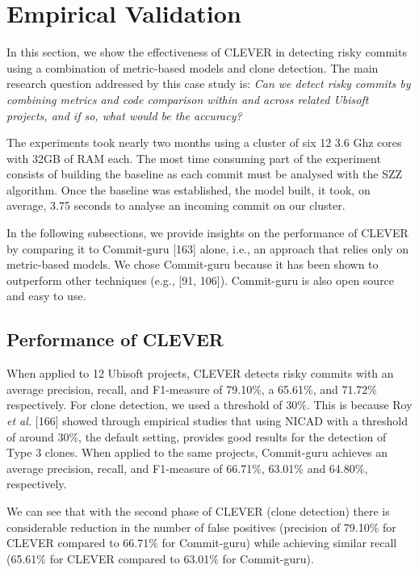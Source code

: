 \documentclass[12pt]{report}
\begin{document}
\section{Empirical Validation}\label{sec:result-bianca}

In this section, we show the effectiveness of CLEVER in detecting risky
commits using a combination of metric-based models and clone detection.
The main research question addressed by this case study is: \emph{Can we
detect risky commits by combining metrics and code comparison within and
across related Ubisoft projects, and if so, what would be the accuracy?}

The experiments took nearly two months using a cluster of six 12 3.6 Ghz
cores with 32GB of RAM each. The most time consuming part of the
experiment consists of building the baseline as each commit must be
analysed with the SZZ algorithm. Once the baseline was established, the
model built, it took, on average, 3.75 seconds to analyse an incoming
commit on our cluster.

In the following subsections, we provide insights on the performance of
CLEVER by comparing it to Commit-guru {[}163{]} alone, i.e., an approach
that relies only on metric-based models. We chose Commit-guru because it
has been shown to outperform other techniques (e.g., {[}91, 106{]}).
Commit-guru is also open source and easy to use.

\subsection{Performance of CLEVER}\label{performance-of-clever}

When applied to 12 Ubisoft projects, CLEVER detects risky commits with
an average precision, recall, and F1-measure of 79.10\%, a 65.61\%, and
71.72\% respectively. For clone detection, we used a threshold of 30\%.
This is because Roy \emph{et al.} {[}166{]} showed through empirical
studies that using NICAD with a threshold of around 30\%, the default
setting, provides good results for the detection of Type 3 clones. When
applied to the same projects, Commit-guru achieves an average precision,
recall, and F1-measure of 66.71\%, 63.01\% and 64.80\%, respectively.

We can see that with the second phase of CLEVER (clone detection) there
is considerable reduction in the number of false positives (precision of
79.10\% for CLEVER compared to 66.71\% for Commit-guru) while achieving
similar recall (65.61\% for CLEVER compared to 63.01\% for Commit-guru).
\end{document}
